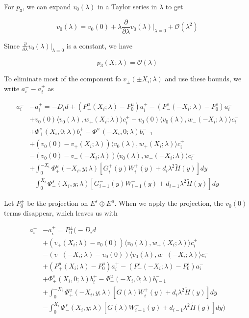 \documentclass[12pt]{article}
\begin{document}
For $p_3$, we can expand $v_0(\lambda)$ in a Taylor series in $\lambda$ to get

\[
v_0(\lambda) = v_0(0) + \lambda \frac{\partial}{\partial \lambda}v_0(\lambda)\Big|_{\lambda = 0} + \mathcal{O}(\lambda^2)
\]

Since $\frac{\partial}{\partial \lambda}v_0(\lambda)\Big|_{\lambda = 0}$ is a constant, we have

\[
p_3(X; \lambda) = \mathcal{O}(\lambda) 
\]

To eliminate most of the component fo $v_\pm(\pm X_i; \lambda)$ and use these bounds, we write $a_i^- - a_i^+$ as

\begin{align*}
a_i^- &- a_i^+ = -D_i d + (P^u_+(X_i; \lambda) - P_0^u)a_i^+ - (P^s_-(-X_i; \lambda) - P_0^s)a_i^- \\
&+ v_0(0) \langle v_0(\lambda), w_+(X_i; \lambda) \rangle c_i^+ 
- v_0(0) \langle v_0(\lambda), w_-(-X_i; \lambda) \rangle c_i^- \\
&+ \Phi^s_+(X_i, 0; \lambda)b_i^+ - \Phi^u_-(-X_i, 0; \lambda)b_{i-1}^- \\
&+ (v_0(0) - v_+(X_i; \lambda)) \langle v_0(\lambda), w_+(X_i; \lambda) \rangle c_i^+ \\
&- (v_0(0) - v_-(-X_i; \lambda)) \langle v_0(\lambda), w_-(-X_i; \lambda) \rangle c_i^- \\
&+ \int_0^{-X_i} \Phi^u_+(-X_i, y; \lambda) [ G_i^+(y) W_i^+(y) + d_i \lambda^2 \tilde{H}(y) ] dy \\
&- \int_0^{X_i} \Phi^s_-(X_i, y; \lambda) [ G_{i-1}^-(y) W_{i-1}^-(y) + d_{i-1} \lambda^2 \tilde{H}(y) ] dy  
\end{align*}

Let $P_0^\pm$ be the projection on $E^s \oplus E^u$. When we apply the projection, the $v_0(0)$ terms disappear, which leaves us with

\begin{align*}
a_i^- &- a_i^+ = P_0^\pm \Big(-D_i d \\
&+(v_+(X_i; \lambda) - v_0(0)) \langle v_0(\lambda), w_+(X_i; \lambda) \rangle c_i^+ \\
&- (v_-(-X_i; \lambda) - v_0(0)) \langle v_0(\lambda), w_-(-X_i; \lambda) \rangle c_i^- \\
&+ (P^u_+(X_i; \lambda) - P_0^u)a_i^+ - (P^s_-(-X_i; \lambda) - P_0^s)a_i^- \\
&+ \Phi^s_+(X_i, 0; \lambda)b_i^+ - \Phi^u_-(-X_i, 0; \lambda)b_{i-1}^- \\
&+ \int_0^{-X_i} \Phi^u_+(-X_i, y; \lambda) [ G(\lambda)W_i^+(y) + d_i \lambda^2 \tilde{H}(y) ] dy \\
&- \int_0^{X_i} \Phi^s_-(X_i, y; \lambda) [ G(\lambda)W_{i-1}^-(y) + d_{i-1} \lambda^2 \tilde{H}(y) ] dy \Big)
\end{align*}
\end{document}
